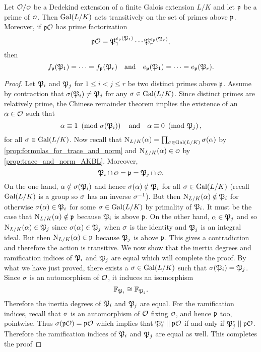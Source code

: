     \begin{proposition}\label{prop:Galois_action_on_primes_is_transitive}
      Let $\mc{O}/\smc{O}$ be a Dedekind extension of a finite Galois extension $L/K$ and let $\mathfrak{p}$ be a prime of $\smc{O}$. Then $\operatorname{\mathrm{Gal}}(L/K)$ acts transitively on the set of primes above $\mathfrak{p}$. Moreover, if $\mathfrak{p}\mathcal{O}$ has prime factorization
      \[
        \mathfrak{p}\mathcal{O} = \mathfrak{P}_{1}^{e_{\mathfrak{p}}(\mathfrak{P}_{1})} \cdots \mathfrak{P}_{r}^{e_{\mathfrak{p}}(\mathfrak{P}_{r})},
      \]
      then
      \[
        f_{\mathfrak{p}}(\mathfrak{P}_{1}) = \cdots = f_{\mathfrak{p}}(\mathfrak{P}_{r}) \quad \text{and} \quad e_{\mathfrak{p}}(\mathfrak{P}_{1}) = \cdots = e_{\mathfrak{p}}(\mathfrak{P}_{r}).
      \]
    \end{proposition}
    \begin{proof}
      Let $\mathfrak{P}_{i}$ and $\mathfrak{P}_{j}$ for $1 \le i < j \le r$ be two distinct primes above $\mathfrak{p}$. Assume by contraction that $\sigma(\mathfrak{P}_{i}) \neq \mathfrak{P}_{j}$ for any $\sigma \in \operatorname{\mathrm{Gal}}(L/K)$. Since distinct primes are relatively prime, the Chinese remainder theorem implies the existence of an $\alpha \in \mathcal{O}$ such that
      \[
        \alpha \equiv 1 \ \left(\text{mod }\sigma(\mathfrak{P}_{i})\right) \quad \text{and} \quad \alpha \equiv 0 \ \left(\text{mod }\mathfrak{P}_{j}\right),
      \]
      for all $\sigma \in \operatorname{\mathrm{Gal}}(L/K)$. Now recall that $\operatorname{\mathrm{N}}_{L/K}(\alpha) = \prod_{\sigma \in \operatorname{\mathrm{Gal}}(L/K)}\sigma(\alpha)$ by \cref{prop:formulas_for_trace_and_norm} and $\Norm_{L/K}(\a) \in \smc{O}$ by \cref{prop:trace_and_norm_AKBL}. Moreover,
      \[
        \mf{P}_{i} \cap \smc{O} = \mf{p} = \mf{P}_{j} \cap \smc{O}.
      \]
      On the one hand, $\alpha \notin \sigma(\mathfrak{P}_{i})$ and hence $\sigma(\alpha) \notin \mathfrak{P}_{i}$ for all $\sigma \in \operatorname{\mathrm{Gal}}(L/K)$ (recall $\operatorname{\mathrm{Gal}}(L/K)$ is a group so $\sigma$ has an inverse $\sigma^{-1}$). But then $\operatorname{\mathrm{N}}_{L/K}(\alpha) \notin \mathfrak{P}_{i}$ for otherwise $\sigma(\alpha) \in \mathfrak{P}_{i}$ for some $\sigma \in \operatorname{\mathrm{Gal}}(L/K)$ by primality of $\mathfrak{P}_{i}$. It must be the case that $\operatorname{\mathrm{N}}_{L/K}(\alpha) \notin \mathfrak{p}$ because $\mathfrak{P}_{i}$ is above $\mathfrak{p}$. On the other hand, $\alpha \in \mathfrak{P}_{j}$ and so $\operatorname{\mathrm{N}}_{L/K}(\alpha) \in \mathfrak{P}_{j}$ since $\sigma(\alpha) \in \mathfrak{P}_{j}$ when $\sigma$ is the identity and $\mathfrak{P}_{j}$ is an integral ideal. But then $\operatorname{\mathrm{N}}_{L/K}(\alpha) \in \mathfrak{p}$ because $\mathfrak{P}_{j}$ is above $\mathfrak{p}$. This gives a contradiction and therefore the action is transitive. We now show that the inertia degrees and ramification indices of $\mathfrak{P}_{i}$ and $\mathfrak{P}_{j}$ are equal which will complete the proof. By what we have just proved, there exists a $\sigma \in \operatorname{\mathrm{Gal}}(L/K)$ such that $\sigma(\mathfrak{P}_{i}) = \mathfrak{P}_{j}$. Since $\sigma$ is an automorphism of $\mathcal{O}$, it induces an isomorphism
      \[
        \mathbb{F}_{\mathfrak{P}_{i}} \cong \mathbb{F}_{\mathfrak{P}_{j}}.
      \]
      Therefore the inertia degrees of $\mathfrak{P}_{i}$ and $\mathfrak{P}_{j}$ are equal. For the ramification indices, recall that $\sigma$ is an automorphism of $\mathcal{O}$ fixing $\smc{O}$, and hence $\mathfrak{p}$ too, pointwise. Thus $\sigma(\mathfrak{p}\mathcal{O}) = \mathfrak{p}\mathcal{O}$ which implies that $\mathfrak{P}_{i}^{e} \mid\mid \mathfrak{p}\mathcal{O}$ if and only if $\mathfrak{P}_{j}^{e} \mid\mid \mathfrak{p}\mathcal{O}$. Therefore the ramification indices of $\mathfrak{P}_{i}$ and $\mathfrak{P}_{j}$ are equal as well. This completes the proof 
    \end{proof}

